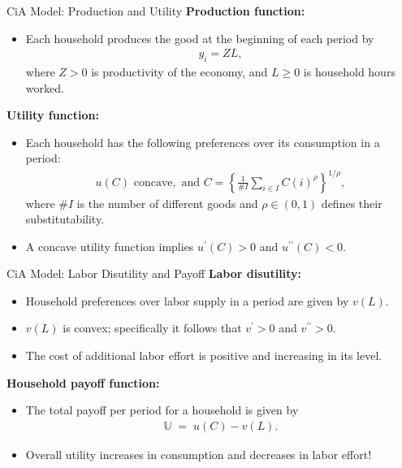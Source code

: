 \documentclass[10pt,c,aspectratio=1610,handout]{beamer}
\begin{document}
\begin{frame}{CiA Model: Production and Utility}%
  \textbf{Production function:}%
  \begin{itemize}%
    \item[$\blacktriangleright$] Each household produces the good at the beginning of each period by%
    \begin{align}%
      y_{i}=ZL,  \label{production function}%
    \end{align}%
    where $Z>0$ is productivity of the economy, and $L\geq 0$ is household hours worked.%
  \end{itemize}%
  \bigskip%
  \pause%
  \textbf{Utility function:}%
  \begin{itemize}%
    \item[$\blacktriangleright$] Each household has the following preferences over its consumption in a period:%
    \begin{align}%
      u(C)\text{ concave},\text{ and }C=\left\{ \frac{1}{\#I}\sum_{i\in I}C(i)^{\rho }\right\}^{1/\rho},  \label{cons preferences}%
    \end{align}%
    where $\#I$ is the number of different goods and $\rho \in (0,1)$ defines their substitutability.%
    \item[$\blacktriangleright$] A concave utility function implies $u^{\prime}(C)>0$ and $u^{\prime \prime}(C)<0$.%
  \end{itemize}%
\end{frame}%
\begin{frame}{CiA Model: Labor Disutility and Payoff}%
  \textbf{Labor disutility:}%
  \begin{itemize}%
    \item[$\blacktriangleright$] Household preferences over labor supply in a period are given by $v(L)$.%
    \item[$\blacktriangleright$] $v(L)$ is convex; specifically it follows that $v^{\prime }>0$ and $v^{\prime \prime }>0.$%
    \item[$\blacktriangleright$] The cost of additional labor effort is positive and increasing in its level.%
  \end{itemize}%
  \vspace*{0.2in}%
  \pause%
  \textbf{Household payoff function:}%
  \begin{itemize}%
    \item[$\blacktriangleright$] The total payoff per period for a household is given by%
    \begin{align}%
      \mathbb{U} \; = \; u(C) - v(L).  \label{static prreferences}%
    \end{align}%
    \item[$\blacktriangleright$] Overall utility increases in consumption and decreases in labor effort!%
  \end{itemize}%
\end{frame}%
\end{document}

